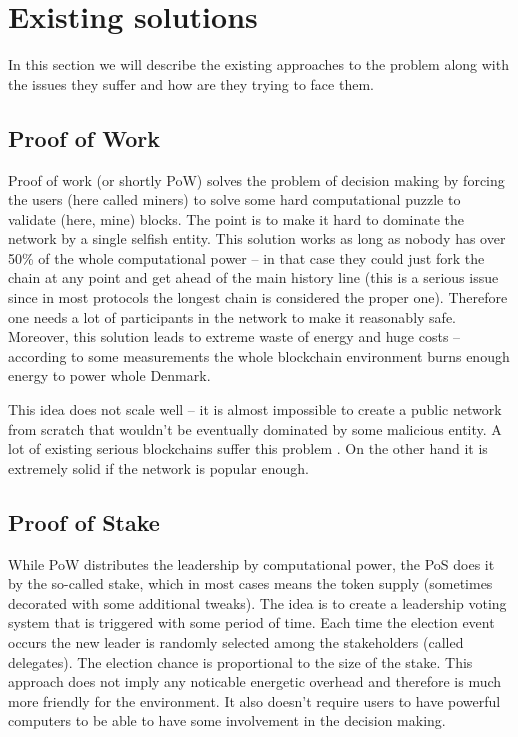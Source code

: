 \section{Existing solutions}

In this section we will describe the existing approaches to the problem along
with the issues they suffer and how are they trying to face them.

\subsection{Proof of Work}

Proof of work (or shortly PoW) solves the problem of decision making by forcing the
users (here called miners) to solve some hard computational puzzle to validate
(here, mine) blocks\cite{bitcoin}.
The point is to make it hard to dominate the network by a
single selfish entity. This solution works as long as nobody has over 50\% of the whole
computational power – in that case they could just fork the chain at any point
and get ahead of the main history line (this is a serious issue since in most
protocols the longest chain is considered the proper one). Therefore one needs a
lot of participants in the network to make it reasonably safe. Moreover, this
solution leads to extreme waste of energy and huge costs – according to some
measurements the whole blockchain environment burns enough energy to power
whole Denmark\cite{bitcoin_energy}.

This idea does not scale well – it is almost impossible to create a public
network from scratch that wouldn't be eventually dominated by some malicious
entity. A lot of existing serious blockchains suffer this problem
\cite{51attack}. On the other hand it is extremely solid if
the network is popular enough.

\subsection{Proof of Stake}

While PoW distributes the leadership by computational power, the PoS does it by
the so-called stake, which in most cases means the token supply (sometimes decorated
with some additional tweaks)\cite{peercoin}\cite{cryptocurr_without_pow}.
The idea is to create a leadership voting system
that is triggered with some period of time. Each time the election event occurs
the new leader is randomly selected among the stakeholders (called delegates).
The election chance is proportional to the size of the stake. This approach does
not imply any noticable energetic overhead and therefore is much more friendly for the
environment. It also doesn't require users to have powerful computers to be able to
have some involvement in the decision making.

